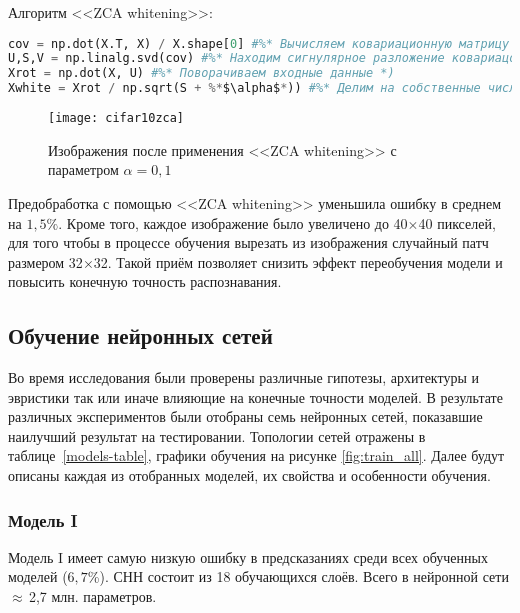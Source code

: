 Алгоритм <<ZCA whitening>>:
\begin{lstlisting}[language=Python, frame=TB]
cov = np.dot(X.T, X) / X.shape[0] #%* Вычисляем ковариационную матрицу *)
U,S,V = np.linalg.svd(cov) #%* Находим сигнулярное разложение ковариацонной матрицы *)
Xrot = np.dot(X, U) #%* Поворачиваем входные данные *)
Xwhite = Xrot / np.sqrt(S + %*$\alpha$*)) #%* Делим на собственные числа *)
\end{lstlisting}
\vspace*{-1.4cm}
\begin{figure}[h]
    \centering
    \texttt{[image: cifar10zca]}
    \caption{Изображения после применения <<ZCA whitening>> с параметром $\alpha=0,1$}
\end{figure}
Предобработка с помощью <<ZCA whitening>> уменьшила ошибку в среднем на $1,5\%$. Кроме того, каждое изображение было
увеличено до 40$\times$40 пикселей, для того чтобы в процессе обучения вырезать из 
изображения случайный патч размером 32$\times$32. Такой приём позволяет снизить эффект переобучения модели и повысить конечную 
точность распознавания.

\subsection{Обучение нейронных сетей}
Во время исследования были проверены различные гипотезы, архитектуры и эвристики так или иначе влияющие на конечные точности 
моделей. В результате различных экспериментов были отобраны семь нейронных сетей, показавшие наилучший результат на тестировании.
Топологии сетей отражены в таблице~\ref{models-table}, графики обучения на рисунке \ref{fig:train_all}.
Далее будут описаны каждая из отобранных моделей, их свойства и особенности обучения.

\subsubsection{Модель I}
Модель I имеет самую низкую ошибку в предсказаниях среди всех обученных моделей ($6,7$\%). СНН состоит из 18 обучающихся слоёв.
Всего в нейронной сети $\approx$\,2,7 млн. параметров.


